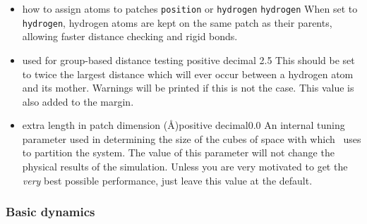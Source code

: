 \begin{itemize}
\item
{}
{how to assign atoms to patches}
{{\tt position} or {\tt hydrogen}}
{{\tt hydrogen}}
{
When set to {\tt hydrogen}, hydrogen atoms are kept on the same patch as their parents, allowing faster distance checking and rigid bonds.
}

\item
{}
{used for group-based distance testing}
{positive decimal}
{2.5}
{
This should be set to twice the largest distance which will ever occur between a hydrogen atom and its mother.  Warnings will be printed if this is not the case.  This value is also added to the margin.
}

\item
{}
{extra length in patch dimension (\AA)}{positive decimal}{0.0}
{An internal tuning parameter used in determining the size of the cubes 
of space with which \NAMD\ uses to partition the system.  The value of 
this parameter will not change the physical results of the simulation.  
Unless you are very motivated to get the {\it very} best 
possible performance, just leave this value at the default.}


\end{itemize}

\subsubsection{Basic dynamics}

